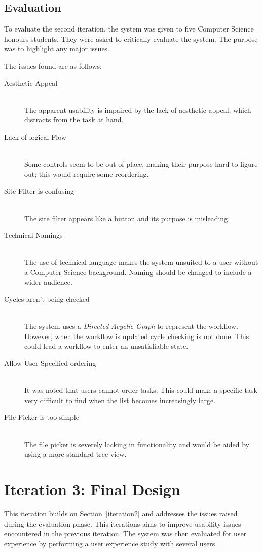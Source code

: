\subsection{Evaluation}
To evaluate the second iteration, the system was given to five Computer Science honours students.
They were asked to critically evaluate the system. The purpose was to highlight any major
issues.

The issues found are as follows:
\begin{description}
    \item[Aesthetic Appeal]\hfill \\
    	The apparent usability is impaired by the lack of aesthetic appeal, which distracts
        from the  task at hand\cite{Tractinsky:1997:AAU:258549.258626}.
    \item[Lack of logical Flow]\hfill \\
        Some controls seem to be out of place, making their purpose hard to
	figure out; this would require some reordering.
    \item[Site Filter is confusing] \hfill \\
        The site filter appears like a button and its purpose is misleading.
    \item[Technical Namings] \hfill \\
        The use of technical language makes the system unsuited to a user without
        a Computer Science background. Naming should be changed to include
        a wider audience.
    \item[Cycles aren't being checked] \hfill \\
        The system uses a \emph{Directed Acyclic Graph} to represent the
	workflow. However, when the workflow is updated cycle checking is not done.
	This could lead a workflow to enter an   unsatisfiable state.
    \item[Allow User Specified ordering] \hfill\\
        It was noted that users cannot order tasks. This could make a specific
	task very difficult to find when the list becomes increasingly large.
    \item[File Picker is too simple] \hfill \\
        The file picker is severely lacking in functionality and would be aided by using a more standard
        tree view.
\end{description}



\section{Iteration 3: Final Design\label{iteration3}}
This iteration builds on Section~\ref{iteration2} and addresses the issues raised during the evaluation
phase. This iterations aims to improve usability issues encountered in the previous iteration. The
system was then evaluated for user experience by performing a user experience study with several users.
